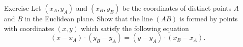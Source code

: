 \begin{thm}{Exercise}\label{ex:line-coord}
Let $(x_A,y_A)$ and $(x_B,y_B)$ be the coordinates of distinct points $A$ and $B$ in the Euclidean plane.
Show that the line $(AB)$ is formed by points with coordinates $(x,y)$ which satisfy the following equation
\[(x-x_A)\cdot (y_B-y_A)=(y-y_A)\cdot (x_B-x_A).\]

\end{thm}










